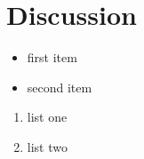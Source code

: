 \documentclass{beamer}
\begin{document}
\section{Discussion}
\begin{frame}
  \begin{itemize}
  \item first item
  \item second item
  \end{itemize}
  \begin{enumerate}
  \item list one
  \item list two
  \end{enumerate}
\end{frame}
\end{document}
